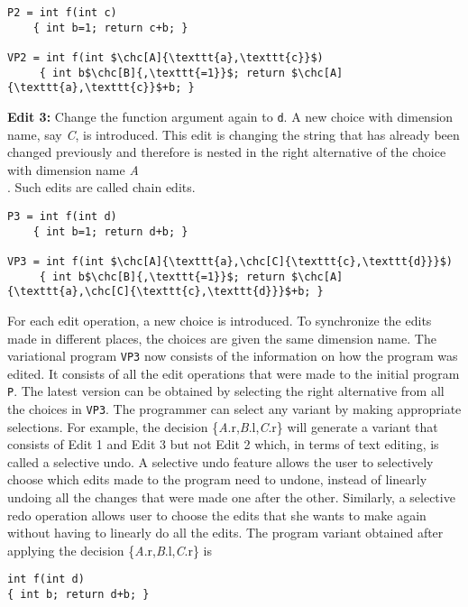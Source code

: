 \begin{lstlisting}
P2 = int f(int c)
    { int b=1; return c+b; }
    
VP2 = int f(int $\chc[A]{\texttt{a},\texttt{c}}$)
     { int b$\chc[B]{,\texttt{=1}}$; return $\chc[A]{\texttt{a},\texttt{c}}$+b; }
\end{lstlisting}

\textbf{Edit 3:} Change the function argument again to \texttt{d}. A new choice with dimension name, say \textit{C}, is introduced. This edit is changing the string that has already been changed previously and therefore is nested in the right alternative of the choice with dimension name \textit{A}\\
. Such edits are called chain edits.

\begin{lstlisting}
P3 = int f(int d)
    { int b=1; return d+b; }
    
VP3 = int f(int $\chc[A]{\texttt{a},\chc[C]{\texttt{c},\texttt{d}}}$)
     { int b$\chc[B]{,\texttt{=1}}$; return $\chc[A]{\texttt{a},\chc[C]{\texttt{c},\texttt{d}}}$+b; }
\end{lstlisting}

For each edit operation, a new choice is introduced. To synchronize the edits made in different places, the choices are given the same dimension name. The variational program \texttt{VP3} now consists of the information on how the program was edited. It consists of all the edit operations that were made to the initial program \texttt{P}. The latest version can be obtained by selecting the right alternative from all the choices in \texttt{VP3}. The programmer can select any variant by making appropriate selections. For example, the decision \{\textit{A}.r,\textit{B}.l,\textit{C}.r\} will generate a variant that consists of Edit 1 and Edit 3 but not Edit 2 which, in terms of text editing, is called a selective undo. A selective undo feature allows the user to selectively choose which edits made to the program need to undone, instead of linearly undoing all the changes that were made one after the other. Similarly, a selective redo operation allows user to choose the edits that she wants to make again without having to linearly do all the edits. The program variant obtained after applying the decision \{\textit{A}.r,\textit{B}.l,\textit{C}.r\} is

\begin{lstlisting}
int f(int d)
{ int b; return d+b; }
\end{lstlisting}